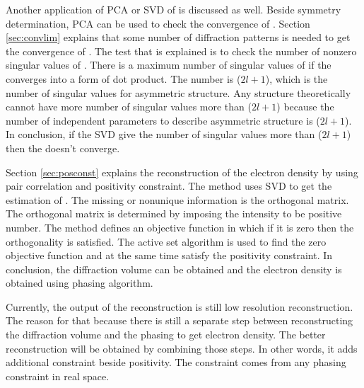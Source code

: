 Another application of PCA or SVD of \Blq is discussed as well. Beside symmetry determination, PCA can be used to check the convergence of \Blq. Section \ref{sec:convlim} explains that some number of diffraction patterns is needed to get the convergence of \Blq. The test that is explained is to check the number of nonzero singular values of \Blq. There is a maximum number of singular values of \Blq if the \Blq converges into a form of dot product. The number is ($2l+1$), which is the number of singular values for asymmetric structure. Any structure theoretically cannot have more number of singular values more than ($2l+1$) because the number of independent parameters to describe asymmetric structure is ($2l+1$). In conclusion, if the SVD \Blq give the number of singular values more than ($2l+1$) then the \Blq doesn't converge.  
   
Section \ref{sec:posconst} explains the reconstruction of the electron density by using pair correlation and positivity constraint. The method uses SVD to get the estimation of \Ilm. The missing or nonunique information is the orthogonal matrix. The orthogonal matrix is determined by imposing the intensity to be positive number. The method defines an objective function in which if it is zero then the orthogonality is satisfied. The active set algorithm is used to find the zero objective function and at the same time satisfy the positivity constraint. In conclusion, the diffraction volume can be obtained and the electron density is obtained using phasing algorithm.  

Currently, the output of the reconstruction is still low resolution reconstruction. The reason for that because there is still a separate step between reconstructing the diffraction volume and the phasing to get electron density. The better reconstruction will be obtained by combining those steps. In other words, it adds additional constraint beside positivity. The constraint comes from any phasing constraint in real space. 

